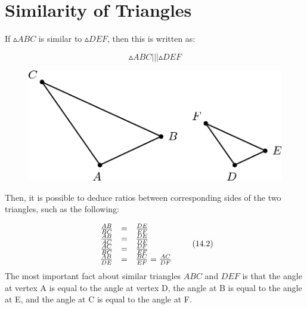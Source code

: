             \section{ Similarity of Triangles}
            \nopagebreak
      \label{m39405*id78153}If $▵ABC$ is similar to $▵DEF$, then this is written as:\par 
      \label{m39405*id78186}\nopagebreak\noindent{}
    \begin{equation}
    ▵ABC|||▵DEF\tag{14.1}
      \end{equation}
      \label{m39405*id78214}
    \setcounter{subfigure}{0}
	\begin{figure}[H] %
    \begin{center}
    \label{m39405*id78218!!!underscore!!!media}\label{m39405*id78218!!!underscore!!!printimage}\includegraphics{col11306.imgs/m39405_MG10C15_001.png} %
      \vspace{2pt}
    \vspace{.1in}
    \end{center}
 \end{figure}       
      \par 
      \label{m39405*id78224}Then, it is possible to deduce ratios between corresponding sides of the two triangles, such as the following:\par 
      \label{m39405*id78228}\nopagebreak\noindent{}
        
    \begin{equation}
    \begin{array}{ccc}\hfill \frac{AB}{BC}& =& \frac{DE}{EF}\hfill \\ \hfill \frac{AB}{AC}& =& \frac{DE}{DF}\hfill \\ \hfill \frac{AC}{BC}& =& \frac{DF}{EF}\hfill \\ \hfill \frac{AB}{DE}& =& \frac{BC}{EF}=\frac{AC}{DF}\hfill \end{array}\tag{14.2}
      \end{equation}
      \label{m39405*id78401}The most important fact about similar triangles $ABC$ and $DEF$ is that the angle at vertex A is equal to the angle at vertex D, the angle at B is equal to the angle at E, and the angle at C is equal to the angle at F.\par 
      \label{m39405*id78434}\nopagebreak\noindent{}
        
